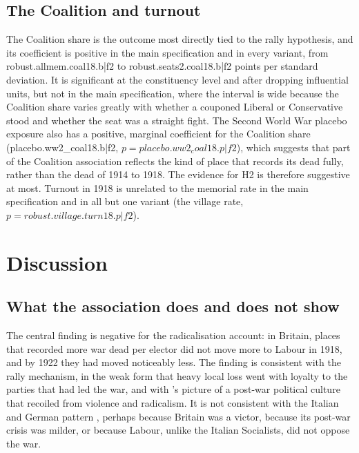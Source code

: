 \documentclass[11pt,a4paper]{article}
\begin{document}
\subsection{The Coalition and turnout}
The Coalition share is the outcome most directly tied to the rally hypothesis, and its coefficient is positive in the main specification and in every variant, from {{robust.allmem.coal18.b|f2}} to {{robust.seats2.coal18.b|f2}} points per standard deviation. It is significant at the constituency level and after dropping influential units, but not in the main specification, where the interval is wide because the Coalition share varies greatly with whether a couponed Liberal or Conservative stood and whether the seat was a straight fight. The Second World War placebo exposure also has a positive, marginal coefficient for the Coalition share ({{placebo.ww2_coal18.b|f2}}, $p={{placebo.ww2_coal18.p|f2}}$), which suggests that part of the Coalition association reflects the kind of place that records its dead fully, rather than the dead of 1914 to 1918. The evidence for H2 is therefore suggestive at most. Turnout in 1918 is unrelated to the memorial rate in the main specification and in all but one variant (the village rate, $p={{robust.village.turn18.p|f2}}$).

\section{Discussion}\label{sec:disc}
\subsection{What the association does and does not show}
The central finding is negative for the radicalisation account: in Britain, places that recorded more war dead per elector did not move more to Labour in 1918, and by 1922 they had moved noticeably less. The finding is consistent with the rally mechanism, in the weak form that heavy local loss went with loyalty to the parties that had led the war, and with \citet{lawrence2003}'s picture of a post-war political culture that recoiled from violence and radicalism. It is not consistent with the Italian and German pattern \citep{acemoglu2022,dejuan2024}, perhaps because Britain was a victor, because its post-war crisis was milder, or because Labour, unlike the Italian Socialists, did not oppose the war.
\end{document}
